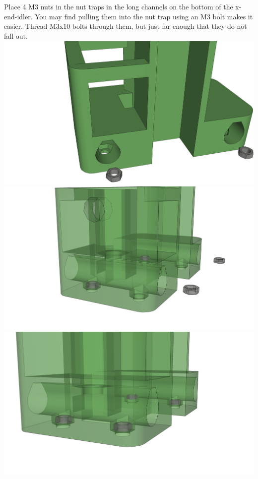 \documentclass[twoside,openany,a4paper,titlepage]{memoir}
\begin{document}
	\section{}
	Place 4 M3 nuts in the nut traps in the long channels on the bottom of the x-end-idler. You may find
	pulling them into the nut trap using an M3 bolt makes it easier. Thread M3x10 bolts through them, but
	just far enough that they do not fall out.\\
	\includegraphics[width=1\linewidth]{graphics/ch7_3_1.png}
	\includegraphics[width=1\linewidth]{graphics/ch7_3_2.png}
	\includegraphics[width=1\linewidth]{graphics/ch7_3_3.png}
\end{document}
